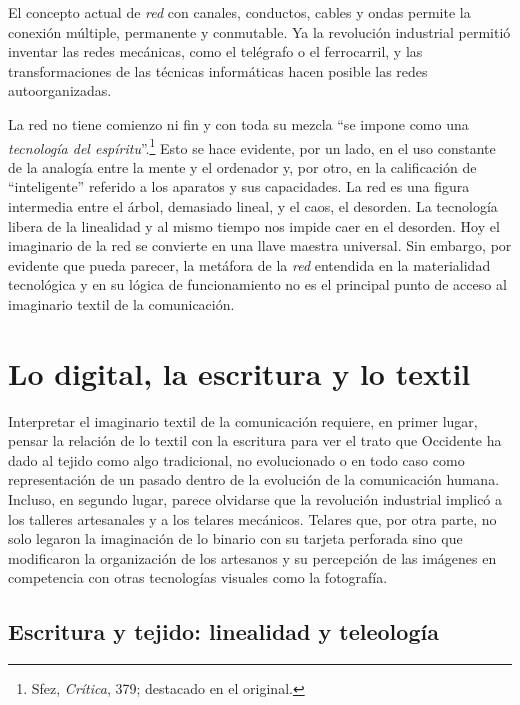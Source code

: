 \documentclass{tufte-handout}
\begin{document}
El concepto actual de \emph{red} con canales, conductos, cables y ondas
permite la conexión múltiple, permanente y conmutable. Ya la revolución
industrial permitió inventar las redes mecánicas, como el telégrafo o el
ferrocarril, y las transformaciones de las técnicas informáticas hacen
posible las redes autoorganizadas.

La red no tiene comienzo ni fin y con toda su mezcla ``se impone como
una \emph{tecnología del espíritu}''.\footnote{Sfez, \emph{Crítica},
  379; destacado en el original.} Esto se hace evidente, por un lado, en
el uso constante de la analogía entre la mente y el ordenador y, por
otro, en la calificación de ``inteligente'' referido a los aparatos y
sus capacidades. La red es una figura intermedia entre el árbol,
demasiado lineal, y el caos, el desorden. La tecnología libera de la
linealidad y al mismo tiempo nos impide caer en el desorden. Hoy el
imaginario de la red se convierte en una llave maestra universal. Sin
embargo, por evidente que pueda parecer, la metáfora de la \emph{red}
entendida en la materialidad tecnológica y en su lógica de
funcionamiento no es el principal punto de acceso al imaginario textil
de la comunicación.

\hypertarget{lo-digital-la-escritura-y-lo-textil}{%
\section{Lo digital, la escritura y lo
textil}\label{lo-digital-la-escritura-y-lo-textil}}

Interpretar el imaginario textil de la comunicación requiere, en primer
lugar, pensar la relación de lo textil con la escritura para ver el
trato que Occidente ha dado al tejido como algo tradicional, no
evolucionado o en todo caso como representación de un pasado dentro de
la evolución de la comunicación humana. Incluso, en segundo lugar,
parece olvidarse que la revolución industrial implicó a los talleres
artesanales y a los telares mecánicos. Telares que, por otra parte, no
solo legaron la imaginación de lo binario con su tarjeta perforada sino
que modificaron la organización de los artesanos y su percepción de las
imágenes en competencia con otras tecnologías visuales como la
fotografía.

\hypertarget{escritura-y-tejido-linealidad-y-teleologa}{%
\subsection{Escritura y tejido: linealidad y
teleología}\label{escritura-y-tejido-linealidad-y-teleologa}}
\end{document}
